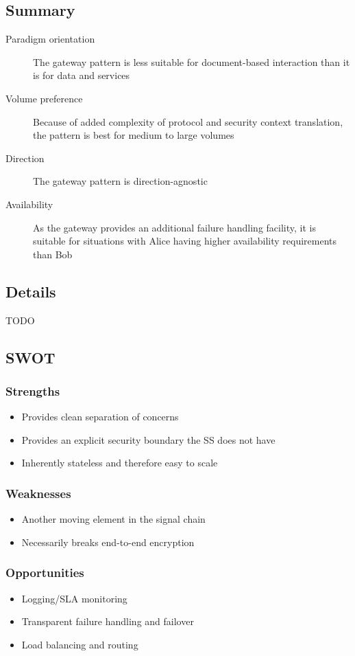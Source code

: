 \documentclass[10pt,a4paper]{article}
\begin{document}
\subsection{Summary}
\begin{description}
	\item[Paradigm orientation] The gateway pattern is less suitable for document-based interaction than it is for data and services
	\item[Volume preference] Because of added complexity of protocol and security context translation, the pattern is best for medium to large volumes
	\item[Direction] The gateway pattern is direction-agnostic 
	\item[Availability] As the gateway provides an additional failure handling facility, it is suitable for situations with Alice having higher availability requirements than Bob
\end{description}

\subsection{Details}
TODO

\subsection{SWOT}
\subsubsection{Strengths}
\begin{itemize}
	\item Provides clean separation of concerns
	\item Provides an explicit security boundary the SS does not have
	\item Inherently stateless and therefore easy to scale
\end{itemize}

\subsubsection{Weaknesses}
\begin{itemize}
	\item Another moving element in the signal chain
	\item Necessarily breaks end-to-end encryption
\end{itemize}
	
\subsubsection{Opportunities}
\begin{itemize}
	\item Logging/SLA monitoring
	\item Transparent failure handling and failover
	\item Load balancing and routing
\end{itemize}
\end{document}
